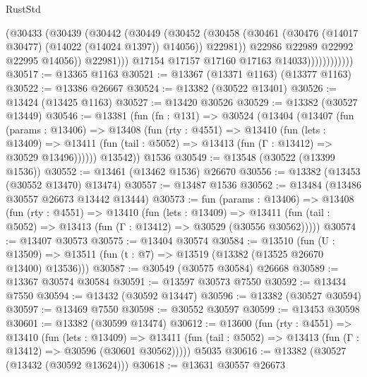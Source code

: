 \begin{lexlean}{RustStd}
\begin{coremodule}
                              (@30433
                                (@30439
                                  (@30442
                                    (@30449
                                      (@30452
                                        (@30458
                                          (@30461
                                            (@30476 (@14017 @30477) (@14022 (@14024 @1397)) @14056))
                                          @22981))
                                      @22986
                                      @22989
                                      @22992
                                      @22995
                                      @14056))
                                  @22981)))
                            @17154
                            @17157
                            @17160
                            @17163
                            @14033))))))))))))
@30517 := @13365 @1163
@30521 := @13367 (@13371 @1163) (@13377 @1163)
@30522 := @13386 @26667
@30524 := @13382 (@30522 @13401)
@30526 := @13424 (@13425 @1163)
@30527 := @13420 @30526
@30529 := @13382 (@30527 @13449)
@30546 := @13381
    (fun (fn : @131) =>
    @30524
      (@13404
        (@13407
          (fun (params : @13406) =>
          @13408
            (fun (rty : @4551) =>
            @13410
              (fun (lets : @13409) =>
              @13411 (fun (tail : @5052) => @13413 (fun (Γ : @13412) => @30529 @13496))))))
        @13542))
    @1536
@30549 := @13548 (@30522 (@13399 @1536))
@30552 := @13461 (@13462 @1536) @26670
@30556 := @13382 (@13453 (@30552 @13470) @13474)
@30557 := @13487 @1536
@30562 := @13484 (@13486 @30557 @26673 @13442 @13444)
@30573 := fun (params : @13406) =>
  @13408
    (fun (rty : @4551) =>
    @13410
      (fun (lets : @13409) =>
      @13411 (fun (tail : @5052) => @13413 (fun (Γ : @13412) => @30529 (@30556 @30562)))))
@30574 := @13407 @30573
@30575 := @13404 @30574
@30584 := @13510
    (fun (U : @13509) => @13511 (fun (t : @7) => @13519 (@13382 (@13525 @26670 @13400) @13536)))
@30587 := @30549 (@30575 @30584) @26668
@30589 := @13367 @30574 @30584
@30591 := @13597 @30573 @7550
@30592 := @13434 @7550
@30594 := @13432 (@30592 @13447)
@30596 := @13382 (@30527 @30594)
@30597 := @13469 @7550
@30598 := @30552 @30597
@30599 := @13453 @30598
@30601 := @13382 (@30599 @13474)
@30612 := @13600
    (fun (rty : @4551) =>
    @13410
      (fun (lets : @13409) =>
      @13411 (fun (tail : @5052) => @13413 (fun (Γ : @13412) => @30596 (@30601 @30562)))))
    @5035
@30616 := @13382 (@30527 (@13432 (@30592 @13624)))
@30618 := @13631 @30557 @26673

\end{coremodule}
\end{lexlean}
